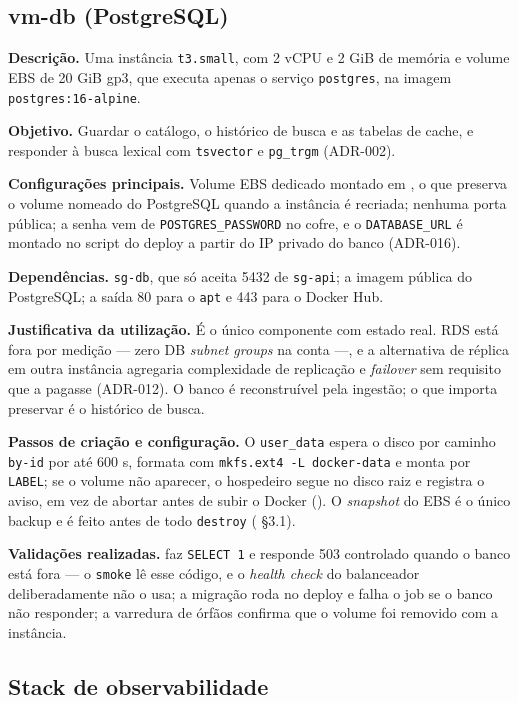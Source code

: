 \documentclass[11pt,a4paper]{article}
\begin{document}
\subsection{vm-db (PostgreSQL)}

\textbf{Descrição.} Uma instância \texttt{t3.small}, com 2 vCPU e 2 GiB de memória e volume EBS de
20 GiB gp3, que executa apenas o serviço \texttt{postgres}, na imagem
\texttt{postgres:16-alpine}.

\textbf{Objetivo.} Guardar o catálogo, o histórico de busca e as tabelas de cache, e responder à
busca lexical com \texttt{tsvector} e \texttt{pg\_trgm} (ADR-002).

\textbf{Configurações principais.} Volume EBS dedicado montado em , o que
preserva o volume nomeado do PostgreSQL quando a instância é recriada; nenhuma porta pública; a
senha vem de \texttt{POSTGRES\_PASSWORD} no cofre, e o \texttt{DATABASE\_URL} é montado no script do
deploy a partir do IP privado do banco (ADR-016).

\textbf{Dependências.} \texttt{sg-db}, que só aceita 5432 de \texttt{sg-api}; a imagem pública do
PostgreSQL; a saída 80 para o \texttt{apt} e 443 para o Docker Hub.

\textbf{Justificativa da utilização.} É o único componente com estado real. RDS está fora por
medição --- zero DB \emph{subnet groups} na conta ---, e a alternativa de réplica em outra instância
agregaria complexidade de replicação e \emph{failover} sem requisito que a pagasse (ADR-012). O
banco é reconstruível pela ingestão; o que importa preservar é o histórico de busca.

\textbf{Passos de criação e configuração.} O \texttt{user\_data} espera o disco por caminho
\texttt{by-id} por até 600 s, formata com \texttt{mkfs.ext4 -L docker-data} e monta por
\texttt{LABEL}; se o volume não aparecer, o hospedeiro segue no disco raiz e registra o aviso, em vez
de abortar antes de subir o Docker (). O \emph{snapshot} do EBS é o único
backup e é feito antes de todo \texttt{destroy} ( §3.1).

\textbf{Validações realizadas.}  faz \texttt{SELECT 1} e responde 503 controlado
quando o banco está fora --- o \texttt{smoke} lê esse código, e o \emph{health check} do balanceador
deliberadamente não o usa; a migração roda no deploy e falha o job se o banco não responder; a
varredura de órfãos confirma que o volume foi removido com a instância.

\subsection{Stack de observabilidade}
\end{document}
